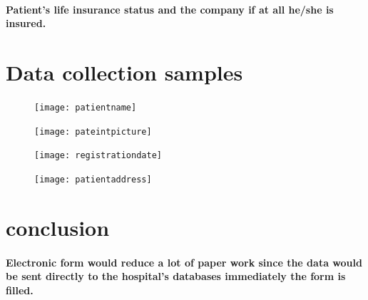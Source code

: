 \documentclass[10pt,a4paper]{article}
\begin{document}
\paragraph{Patient's life insurance status and the company if at all he/she is insured.}
\section{Data collection samples}
\begin{figure}[h]
\texttt{[image: patientname]} 
\end{figure}
\begin{figure}[h]
\texttt{[image: pateintpicture]} 
\end{figure}
\begin{figure}[h]
\texttt{[image: registrationdate]} 
\end{figure}
\begin{figure}[h]
\texttt{[image: patientaddress]} 
\end{figure}
\section{conclusion}
\paragraph{Electronic form would reduce a lot of paper work since the data would be sent directly to the hospital's databases immediately the form is filled.}
\end{document}
